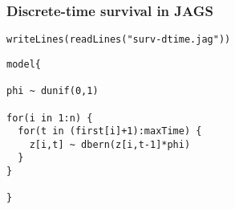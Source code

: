 \documentclass[color=usenames,dvipsnames]{beamer}\usepackage[]{graphicx}\usepackage[]{color}
\makeatletter
\newcommand{\hlstr}[1]{\textcolor[rgb]{0.749,0.012,0.012}{#1}}%
\newcommand{\hlstd}[1]{\textcolor[rgb]{0,0,0}{#1}}%
\newcommand{\hlkwd}[1]{\textcolor[rgb]{0.004,0.004,0.506}{#1}}%
\newenvironment{kframe}{%
 \def\at@end@of@kframe{}%
 \ifinner\ifhmode%
  \def\at@end@of@kframe{\end{minipage}}%
  \begin{minipage}{\columnwidth}%
 \fi\fi%
 \def\FrameCommand##1{\hskip\@totalleftmargin \hskip-\fboxsep
 \colorbox{shadecolor}{##1}\hskip-\fboxsep
     \hskip-\linewidth \hskip-\@totalleftmargin \hskip\columnwidth}%
 \MakeFramed {\advance\hsize-\width
   \@totalleftmargin\z@ \linewidth\hsize
   \@setminipage}}%
 {\par\unskip\endMakeFramed%
 \at@end@of@kframe}
\newenvironment{knitrout}{}{} %
\makeatother
\begin{document}
\begin{frame}[fragile]
  \frametitle{Discrete-time survival in JAGS}
\begin{knitrout}
\color{fgcolor}\begin{kframe}
\begin{alltt}
\hlkwd{writeLines}\hlstd{(}\hlkwd{readLines}\hlstd{(}\hlstr{"surv-dtime.jag"}\hlstd{))}
\end{alltt}
\end{kframe}
\end{knitrout}
\begin{knitrout}
\color{fgcolor}\begin{kframe}
\begin{verbatim}
model{

phi ~ dunif(0,1)

for(i in 1:n) {
  for(t in (first[i]+1):maxTime) {
    z[i,t] ~ dbern(z[i,t-1]*phi)
  }
}

}
\end{verbatim}
\end{kframe}
\end{knitrout}
\end{frame}
\end{document}
